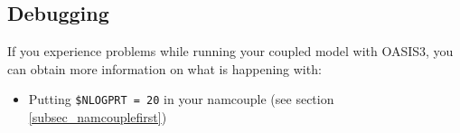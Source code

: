 \subsection{Debugging}

If you experience problems while running your coupled model with OASIS3, you can obtain more information on what is happening with:
\begin{itemize}
\item Putting {\tt \$NLOGPRT = 20} in your namcouple (see section \ref{subsec_namcouplefirst})
\end{itemize}

